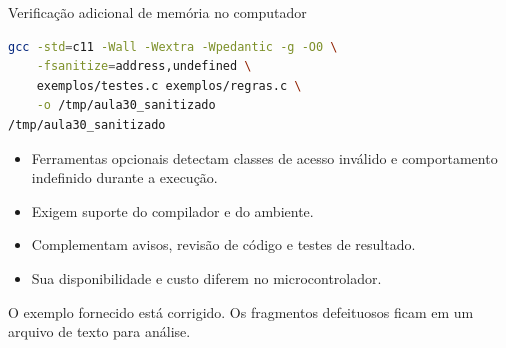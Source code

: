 \begin{frame}[fragile]{Verificação adicional de memória no computador}
\begin{lstlisting}[language=bash]
gcc -std=c11 -Wall -Wextra -Wpedantic -g -O0 \
    -fsanitize=address,undefined \
    exemplos/testes.c exemplos/regras.c \
    -o /tmp/aula30_sanitizado
/tmp/aula30_sanitizado
\end{lstlisting}
\begin{itemize}
\item Ferramentas opcionais detectam classes de acesso inválido e comportamento indefinido durante a execução.
\item Exigem suporte do compilador e do ambiente.
\item Complementam avisos, revisão de código e testes de resultado.
\item Sua disponibilidade e custo diferem no microcontrolador.
\end{itemize}
\small O exemplo fornecido está corrigido. Os fragmentos defeituosos ficam em um arquivo de texto para análise.
\end{frame}
